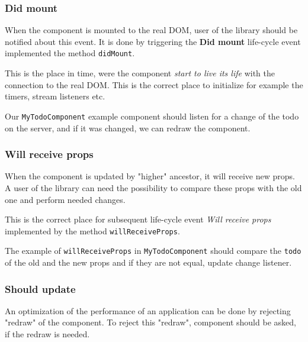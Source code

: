     \subsubsection{Did mount}\label{subsec:our-architecture-lifecycle-didmount}

      When the component is mounted to the real DOM, user of the library should be notified about this event. 
      It is done by triggering the \textbf{Did mount} life-cycle event implemented the method \texttt{didMount}. 

      This is the place in time, were the component \textit{start to live its life} with the connection to the real DOM.
      This is the correct place to initialize for example the timers, stream listeners etc. 

      Our \texttt{MyTodoComponent} example component should listen for a change of the todo on the server, 
      and if it was changed, we can redraw the component.
      

    \subsubsection{Will receive props}\label{subsec:our-architecture-lifecycle-willreceiveprops}

      When the component is updated by "higher" ancestor, it will receive new props.
      A user of the library can need the possibility to compare these props with the old one
      and perform needed changes. 

      This is the correct place for subsequent life-cycle event \textit{Will receive props}
      implemented by the method \texttt{willReceiveProps}. 

      The example of \texttt{willReceiveProps} in \texttt{MyTodoComponent} 
      should compare the \texttt{todo} of the old and the new props and if they are not equal, 
      update change listener.
      
      
    \subsubsection{Should update}\label{subsec:our-architecture-lifecycle-shouldupdate}

      An optimization of the performance of an application can be done by rejecting "redraw" of the component.
      To reject this "redraw", component should be asked, if the redraw is needed. 


